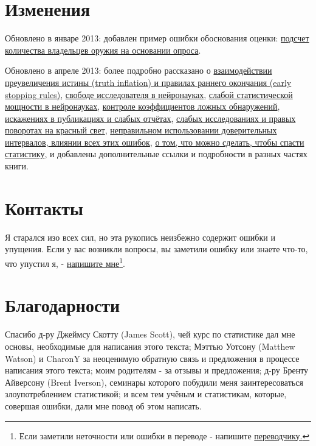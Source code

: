 \section{Изменения}
\label{chp1:changes}

Обновлено в январе 2013: добавлен пример ошибки обоснования оценки: \hyperref[chp5:arms-baserateF]{подсчет количества владельцев оружия на основании опроса}.  

Обновлено в апреле 2013: более подробно рассказано о \hyperref[chp7:truthinflation]{взаимодействии преувеличения истины (truth inflation) и правилах раннего окончания (early stopping rules)}, \hyperref[chp5:redherrings]{свободе исследователя в нейронауках}, \hyperref[chp3:powerunderpowered]{слабой статистической мощности в нейронауках}, \hyperref[chp5:controlfalserate]{контроле коэффициентов ложных обнаружений}, \hyperref[chp10]{искажениях в публикациях и слабых отчётах}, \hyperref[chp3:wrongturnred]{слабых исследованиях и правых поворотах на красный свет}, \hyperref[chp6:significantdiffmissed]{неправильном использовании доверительных интервалов},\hyperref[chp11]{
влиянии всех этих ошибок}, \hyperref[chp12]{о том, что можно сделать, чтобы спасти статистику}, и добавлены дополнительные ссылки и подробности в разных частях книги.

\section{Контакты}
\label{chp1:contact}

Я старался изо всех сил, но эта рукопись неизбежно содержит ошибки и упущения. Если у вас возникли вопросы, вы заметили ошибку или знаете что-то, что упустил я, - \href{mailto:alex@refsmmat.com}{напишите мне}\footnote{Если заметили неточности или ошибки в переводе - напишите \href{mailto:pasha.p.komar@googlemail.com}{переводчику.}}.

\section{Благодарности}
\label{chp1:acknow}

Спасибо д-ру Джеймсу Скотту (James Scott), чей курс по статистике дал мне основы, необходимые для написания этого текста; Мэттью Уотсону (Matthew Watson) и CharonY за неоценимую обратную связь и предложения в процессе написания этого текста; моим родителям - за отзывы и предложения; д-ру Бренту Айверсону (Brent Iverson), семинары которого побудили меня заинтересоваться злоупотреблением статистикой; и всем тем учёным и статистикам, которые, совершая ошибки, дали мне повод об этом написать.

